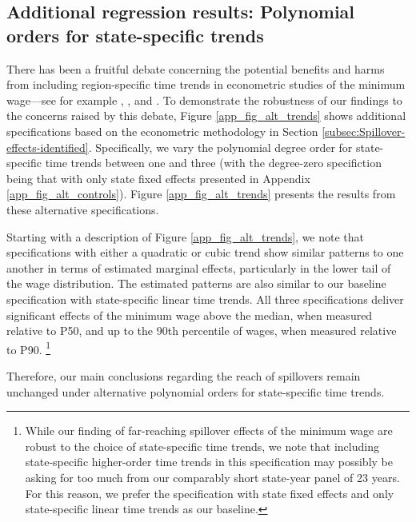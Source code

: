 \clearpage
\subsection{Additional regression results: Polynomial orders for state-specific trends\label{app_subsec:lee_regressions_trends}}

There has been a fruitful debate concerning the potential benefits and harms from including region-specific time trends in econometric studies of the minimum wage---see for example , , and . To demonstrate the robustness of our findings to the concerns raised by this debate, Figure \ref{app_fig_alt_trends} shows additional specifications based on the econometric methodology in Section \ref{subsec:Spillover-effects-identified}. Specifically, we vary the polynomial degree order for state-specific time trends between one and three (with the degree-zero specifiction being that with only state fixed effects presented in Appendix \ref{app_fig_alt_controls}). Figure \ref{app_fig_alt_trends} presents the results from these alternative specifications.

Starting with a description of Figure \ref{app_fig_alt_trends}, we note that specifications with either a quadratic or cubic trend show similar patterns to one another in terms of estimated marginal effects, particularly in the lower tail of the wage distribution. The estimated patterns are also similar to our baseline specification with state-specific linear time trends. All three specifications deliver significant effects of the minimum wage above the median, when measured relative to P50, and up to the 90th percentile of wages, when measured relative to P90.%
%
\footnote{While our finding of far-reaching spillover effects of the minimum wage are robust to the choice of state-specific time trends, we note that including state-specific higher-order time trends in this specification may possibly be asking for too much from our comparably short state-year panel of 23 years. For this reason, we prefer the specification with state fixed effects and only state-specific linear time trends as our baseline.} %
%

Therefore, our main conclusions regarding the reach of spillovers remain unchanged under alternative polynomial orders for state-specific time trends.


